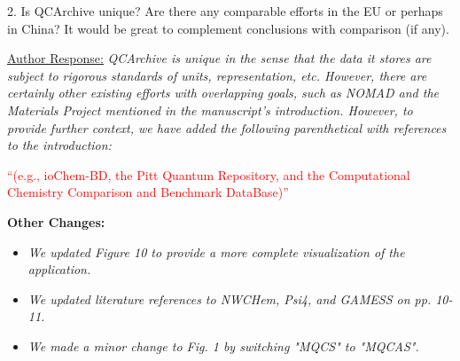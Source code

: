 \documentclass[12pt]{article}
\begin{document}
2.	Is QCArchive unique? Are there any comparable efforts in the EU or perhaps in China? It would be great to complement conclusions with comparison (if any).

\noindent
\underline{Author Response:} \textit{ QCArchive is unique in the sense that the
data it stores are subject to rigorous standards of units, representation, etc.
However, there are certainly other existing efforts with overlapping goals, such
as NOMAD and the Materials Project mentioned in the manuscript's introduction.
However, to provide further context, we have added the following parenthetical
with references
to the introduction:}

\noindent
\textcolor{red}{``(e.g., ioChem-BD, the Pitt Quantum Repository, and the
Computational Chemistry Comparison and Benchmark DataBase)''}

\noindent
\textbf{Other Changes:}

\begin{itemize}
\item \textit{We updated Figure 10 to provide a more complete visualization of the application.}
\item \textit{We updated literature references to NWCHem, Psi4, and
  GAMESS on pp. 10-11.}
\item \textit{We made a minor change to Fig. 1 by switching "MQCS" to "MQCAS".}
\end{itemize}
\end{document}
